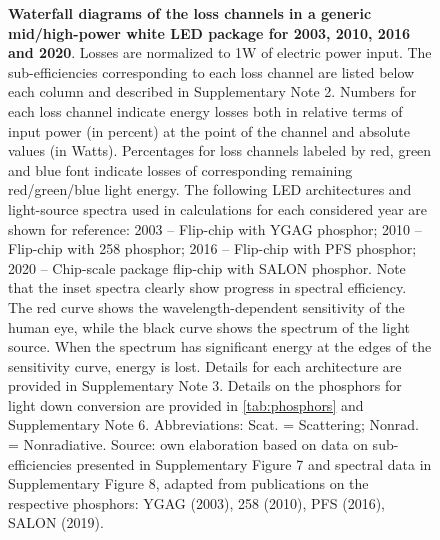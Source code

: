 \documentclass[parskip=full]{article}
\begin{document}
\begin{figure}[H]
 \caption{\textbf{Waterfall diagrams of the loss channels in a generic mid/high-power white LED package for 2003, 2010, 2016 and 2020}. Losses are normalized to 1W of electric power input. The sub-efficiencies corresponding to each loss channel are listed below each column and described in Supplementary Note 2. Numbers for each loss channel indicate energy losses both in relative terms of input power (in percent) at the point of the channel and absolute values (in Watts). Percentages for loss channels labeled by red, green and blue font indicate losses of corresponding remaining red/green/blue light energy. The following LED architectures and light-source spectra used in calculations for each considered year are shown for reference: 2003 – Flip-chip with YGAG phosphor; 2010 – Flip-chip with 258 phosphor; 2016 – Flip-chip with PFS phosphor; 2020 – Chip-scale package flip-chip with SALON phosphor. Note that the inset spectra clearly show progress in spectral efficiency. The red curve shows the wavelength-dependent sensitivity of the human eye, while the black curve shows the spectrum of the light source. When the spectrum has significant energy at the edges of the sensitivity curve, energy is lost. Details for each architecture are provided in Supplementary Note 3.  Details on the phosphors for light down conversion are provided in \cref{tab:phosphors} and Supplementary Note 6. Abbreviations: Scat. = Scattering; Nonrad. = Nonradiative. Source: own elaboration based on data on sub-efficiencies presented in Supplementary Figure 7 and spectral data in Supplementary Figure 8, adapted from publications on the respective phosphors: YGAG (2003)\cite{Mueller2002}, 258 (2010)\cite{MuellerMach2005}, PFS (2016)\cite{Murphy2015}, SALON (2019)\cite{Hoerder2019}.}
 \label{fgr:waterfall}
\end{figure}
\end{document}
